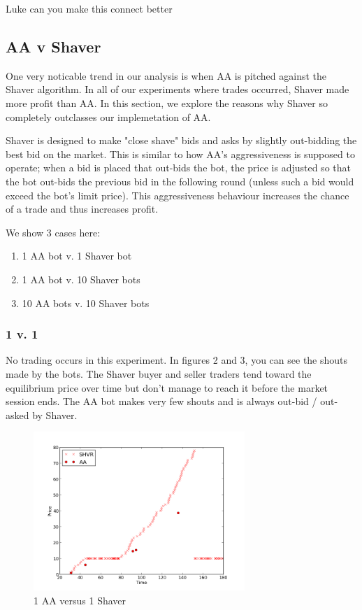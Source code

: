 \documentclass{acm_proc_article-sp}
\begin{document}
Luke can you make this connect better

\subsection{AA v Shaver} One very noticable trend in our analysis is when AA
is pitched against the Shaver algorithm. In all of our experiments where trades
occurred, Shaver made more profit than AA. In this section, we explore the
reasons why Shaver so completely outclasses our implemetation of AA.

Shaver is designed to make "close shave" bids and asks by slightly out-bidding
the best bid on the market. This is similar to how AA's aggressiveness is
supposed to operate; when a bid is placed that out-bids the bot, the price is
adjusted so that the bot out-bids the previous bid in the following round
(unless such a bid would exceed the bot's limit price). This aggressiveness
behaviour increases the chance of a trade and thus increases profit.

We show 3 cases here:
\begin{enumerate}
\item 1 AA bot v. 1 Shaver bot
\item 1 AA bot v. 10 Shaver bots
\item 10 AA bots v. 10 Shaver bots
\end{enumerate}

\subsubsection{1 v. 1} No trading occurs in this experiment. In figures 2 and 3,
you can see the shouts made by the bots. The Shaver buyer and seller traders
tend toward the equilibrium price over time but don't manage to reach it before
the market session ends. The AA bot makes very few shouts and is always out-bid
/ out-asked by Shaver.

\begin{figure}[h!] \includegraphics[width=80mm]{SHVR1AA1_180_all_bids.png}
\caption {1 AA versus 1 Shaver}
\end{figure}
\end{document}

